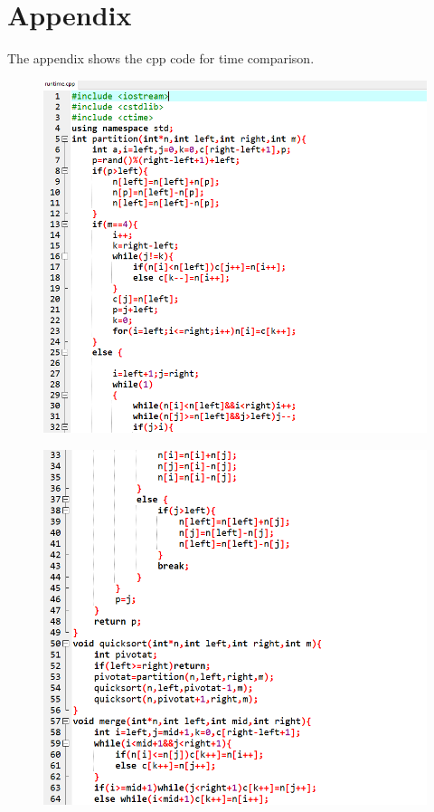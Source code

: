 \documentclass[12pt]{article}
\begin{document}
\section{Appendix}
The appendix shows the cpp code for time comparison.
\begin{figure}[H]
\centering
\includegraphics[scale=0.6]{P3.png}
\end{figure}
\begin{figure}[H]
\centering
\includegraphics[scale=0.6]{P4.png}
\end{figure}
\end{document}
